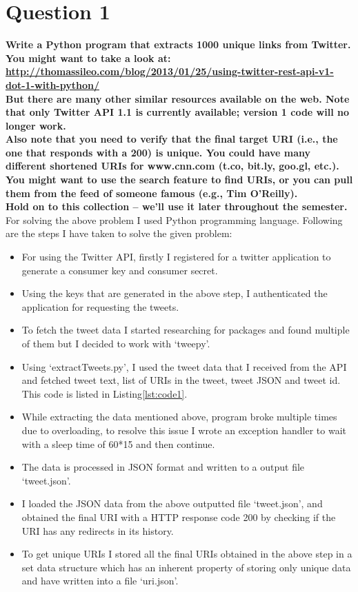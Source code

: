 \chapter{Question 1}
\label{intro}

\textbf{Write a Python program that extracts 1000 unique links from Twitter.  You might want to take a look at:}
\textbf{{\url{http://thomassileo.com/blog/2013/01/25/using-twitter-rest-api-v1-dot-1-with-python/}}}\\

\textbf{But there are many other similar resources available on the web.  Note that only Twitter API 1.1 is currently available; version 1 code will no longer work.\\
Also note that you need to verify that the final target URI (i.e., the one that responds with a 200) is unique.  You could have many different shortened URIs for www.cnn.com (t.co, bit.ly, goo.gl, etc.).\\
You might want to use the search feature to find URIs, or you can pull them from the feed of someone famous (e.g., Tim O'Reilly).\\
Hold on to this collection -- we'll use it later throughout the semester.}\\


For solving the above problem I used Python programming language. Following are the steps I have taken to solve the given problem:
\begin{itemize}
\item For using the Twitter API, firstly I registered for a twitter application to generate a consumer key and consumer secret.
\item Using the keys that are generated in the above step, I authenticated the application for requesting the tweets. 
\item To fetch the tweet data I started researching for packages and found multiple of them but I decided to work with `tweepy'.
\item Using `extractTweets.py', I used the tweet data that I received from the API and fetched tweet text, list of URIs in the tweet, tweet JSON and tweet id. This code is listed in Listing{\ref{lst:code1}}.
\item While extracting the data mentioned above, program broke multiple times due to overloading, to resolve this issue I wrote an exception handler to wait with a sleep time of 60*15 and then continue.
\item The data is processed in JSON format and written to a output file `tweet.json'.
\item I loaded the JSON data from the above outputted file `tweet.json', and obtained the final URI with a HTTP response code 200 by checking if the URI has any redirects in its history. 
\item To get unique URIs I stored all the final URIs obtained in the above step in a set data structure which has an inherent property of storing only unique data and have written into a file `uri.json'.
\end{itemize}

